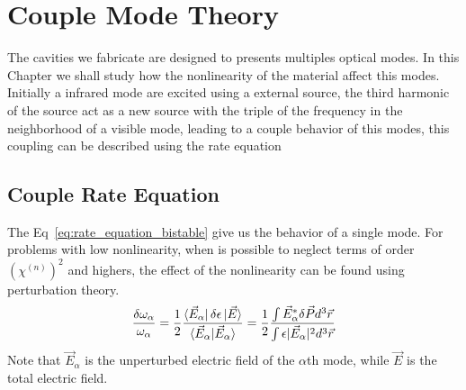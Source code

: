 \chapter{Couple Mode Theory}
\label{chap:couple_mode}

The cavities we fabricate are designed to presents multiples optical modes. In this Chapter we shall study how the nonlinearity of the material affect this modes. Initially a infrared mode are excited using a external source, the third harmonic of the source act as a new source with the triple of the frequency in the neighborhood of a visible mode, leading to a couple behavior of this modes, this coupling can be described using the rate equation  

\section{Couple Rate Equation}
%
%

The Eq~\ref{eq:rate_equation_bistable} give us the behavior of a single mode. For problems with low nonlinearity, when is possible to neglect terms of order $\left(\chi^{(n)}\right)^2$ and highers, the effect of the nonlinearity can be found using perturbation theory. 
\begin{equation}
    \frac{\delta\omega_\alpha}{\omega_\alpha} = \frac{1}{2}\frac{\bra{\vec{E}_\alpha}\delta\epsilon\ket{\vec{E}}}{\braket{\vec{E}_\alpha|\vec{E}_\alpha}} = \frac{1}{2}\frac{\int\vec{E}^*_\alpha\delta\vec{P}d^3\vec{r}}{\int \epsilon|\vec{E}_\alpha|^2d^3\vec{r}}
    \label{eq:perp_theory}
\end{equation}
Note that $\vec{E}_\alpha$ is the unperturbed electric field of the $\alpha$th mode, while $\vec{E}$ is the total electric field. 

